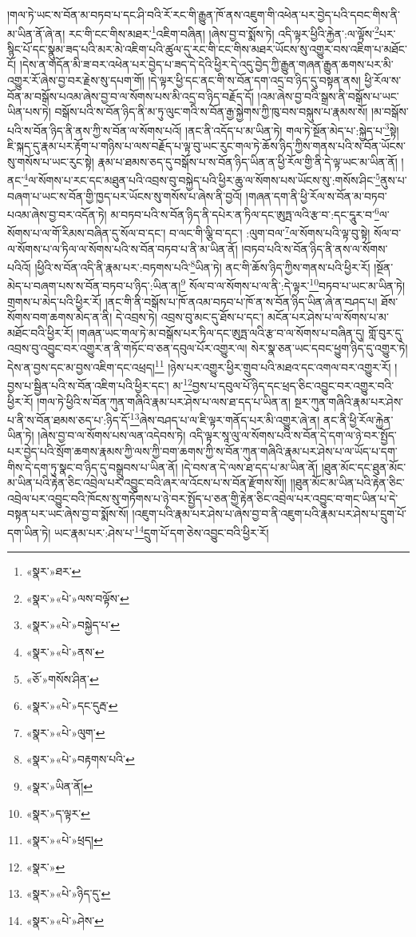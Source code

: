 །གལ་ཏེ་ཡང་ས་བོན་མ་བཏབ་པ་དང་ཤི་བའི་རོ་རང་གི་རྒྱུན་ཁོ་ནས་འཇུག་གི་འཕེན་པར་བྱེད་པའི་དབང་གིས་ནི་མ་ཡིན་ནོ་ཞེ་ན། རང་གི་ངང་གིས་མཐར་\footnote{«སྣར་»ཐར་}འཇིག་བཞིན། །ཞེས་བྱ་བ་སྨོས་ཏེ། འདི་ལྟར་ཕྱིའི་རྐྱེན་:ལ་ལྟོས་\footnote{«སྣར་»«པེ་»ལས་བལྟོས་}པར་སྙིང་པོ་དང་སྣུམ་ཟད་པའི་མར་མེ་འཇིག་པའི་ཚུལ་དུ་རང་གི་ངང་གིས་མཐར་ཡོངས་སུ་འགྱུར་བས་འཇིག་པ་མཐོང་ངོ། །དེས་ན་གདོན་མི་ཟ་བར་འཕེན་པར་བྱེད་པ་ཟད་དེ་དེའི་ཕྱིར་དེ་འདུ་བྱེད་ཀྱི་རྒྱུན་གཞན་རྒྱུན་ཆགས་པར་མི་འགྱུར་རོ་ཞེས་བྱ་བར་རྗེས་སུ་དཔག་གོ། །དེ་ལྟར་ཕྱི་དང་ནང་གི་ས་བོན་དག་འདྲ་བ་ཉིད་དུ་བསྟན་ནས། ཕྱི་རོལ་ས་བོན་མ་བསྒོས་པའམ་ཞེས་བྱ་བ་ལ་སོགས་པས་མི་འདྲ་བ་ཉིད་བརྗོད་དོ། །འམ་ཞེས་བྱ་བའི་སྒྲས་ནི་བསྒོས་པ་ཡང་ཡིན་པས་ཏེ། བསྒོས་པའི་ས་བོན་ཉིད་ནི་མ་ཏུ་ལུང་གའི་ས་བོན་རྒྱ་སྐྱེགས་ཀྱི་ཁུ་བས་བསྐུས་པ་རྣམས་སོ། །མ་བསྒོས་པའི་ས་བོན་ཉིད་ནི་ནས་ཀྱི་ས་བོན་ལ་སོགས་པའོ། །ནང་ནི་འདོད་པ་མ་ཡིན་ཏེ། གལ་ཏེ་སྔོན་མེད་པ་:སྐྱེད་པ་\footnote{«སྣར་»«པེ་»བསྐྱེད་པ་}སྟེ། ཇི་སྐད་དུ་རྣམ་པར་རྟོག་པ་གཉིས་པ་ལས་བརྗོད་པ་ལྟ་བུ་ཡང་རུང་གལ་ཏེ་ཆོས་ཉིད་ཀྱིས་གནས་པའི་ས་བོན་ཡོངས་སུ་གསོས་པ་ཡང་རུང་སྟེ། རྣམ་པ་ཐམས་ཅད་དུ་བསྒོས་པ་ས་བོན་ཉིད་ཡིན་ན་ཕྱི་རོལ་གྱི་ནི་དེ་ལྟ་ཡང་མ་ཡིན་ནོ། །ནང་\footnote{«སྣར་»«པེ་»ནས་}ལ་སོགས་པ་རང་དང་མཐུན་པའི་འབྲས་བུ་བསྐྱེད་པའི་ཕྱིར་ཆུ་ལ་སོགས་པས་ཡོངས་སུ་:གསོས་ཤིང་\footnote{«ཅོ་»གསོས་ཤིན་}ནུས་པ་བཞག་པ་ཡང་ས་བོན་གྱི་ཁྱད་པར་ཡོངས་སུ་གསོས་པ་ཞེས་ནི་བྱའོ། །གཞན་དག་ནི་ཕྱི་རོལ་ས་བོན་མ་བཏབ་པའམ་ཞེས་བྱ་བར་འདོན་ཏེ། མ་བཏབ་པའི་ས་བོན་ཉིད་ནི་དཔེར་ན་ཏིལ་དང་ཨུཏྤ་ལའི་རྩ་བ་:དང་དཱུར་བ་\footnote{«སྣར་»«པེ་»དང་དུརྦ་}ལ་སོགས་པ་ལ་གོ་རིམས་བཞིན་དུ་སོལ་བ་དང་། བ་ལང་གི་ལྕི་བ་དང་། :ལུག་བལ་\footnote{«སྣར་»«པེ་»ལུག་}ལ་སོགས་པའི་ལྟ་བུ་སྟེ། སོལ་བ་ལ་སོགས་པ་ལ་ཏིལ་ལ་སོགས་པའི་ས་བོན་བཏབ་པ་ནི་མ་ཡིན་ནོ། །བཏབ་པའི་ས་བོན་ཉིད་ནི་ནས་ལ་སོགས་པའིའོ། །ཕྱིའི་ས་བོན་འདི་ནི་རྣམ་པར་:བཏགས་པའི་\footnote{«སྣར་»«པེ་»བརྟགས་པའི་}ཡིན་ཏེ། ནང་གི་ཆོས་ཉིད་ཀྱིས་གནས་པའི་ཕྱིར་རོ། །སྔོན་མེད་པ་བཞག་པས་ས་བོན་བཏབ་པ་ཉིད་:ཡིན་ན།\footnote{«སྣར་»ཡིན་ནོ།} སོལ་བ་ལ་སོགས་པ་ལ་ནི་:དེ་ལྟར་\footnote{«སྣར་»ད་ལྟར་}བཏབ་པ་ཡང་མ་ཡིན་ཏེ། གྲགས་པ་མེད་པའི་ཕྱིར་རོ། །ནང་གི་ནི་བསྒོས་པ་ཁོ་ནའམ་བཏབ་པ་ཁོ་ན་ས་བོན་ཉིད་ཡིན་ཞེ་ན་བཤད་པ། ཐོས་སོགས་བག་ཆགས་མེད་ན་ནི། དེ་འབྲས་ཏེ། འབྲས་བུ་མང་དུ་ཐོས་པ་དང་། མངོན་པར་ཤེས་པ་ལ་སོགས་པ་མ་མཐོང་བའི་ཕྱིར་རོ། །གཞན་ཡང་གལ་ཏེ་མ་བསྒོས་པར་ཏིལ་དང་ཨུཏྤ་ལའི་རྩ་བ་ལ་སོགས་པ་བཞིན་དུ། གློ་བུར་དུ་འབྲས་བུ་འབྱུང་བར་འགྱུར་ན་ནི་གཏོང་བ་ཅན་དབུལ་པོར་འགྱུར་ལ། སེར་སྣ་ཅན་ཡང་དབང་ཕྱུག་ཉིད་དུ་འགྱུར་ཏེ། དེས་ན་བྱས་དང་མ་བྱས་འཇིག་དང་འཕྲད།\footnote{«སྣར་»«པེ་»ཕྲད།} །ཉེས་པར་འགྱུར་ཕྱིར་གྲུབ་པའི་མཐའ་དང་འགལ་བར་འགྱུར་རོ། །བྱས་པ་སྦྱིན་པའི་ས་བོན་འཇིག་པའི་ཕྱིར་དང་། མ་\footnote{«སྣར་»}བྱས་པ་དབུལ་པོ་ཉིད་དང་ཕྲད་ཅིང་འབྱུང་བར་འགྱུར་བའི་ཕྱིར་རོ། །གལ་ཏེ་ཕྱིའི་ས་བོན་ཀུན་གཞིའི་རྣམ་པར་ཤེས་པ་ལས་ཐ་དད་པ་ཡིན་ན། སྔར་ཀུན་གཞིའི་རྣམ་པར་ཤེས་པ་ནི་ས་བོན་ཐམས་ཅད་པ་:ཉིད་དོ་\footnote{«སྣར་»«པེ་»ཉིད་དུ་}ཞེས་བཤད་པ་ལ་ཇི་ལྟར་གནོད་པར་མི་འགྱུར་ཞེ་ན། ནང་ནི་ཕྱི་རོལ་རྐྱེན་ཡིན་ཏེ། །ཞེས་བྱ་བ་ལ་སོགས་པས་ལན་འདེབས་ཏེ། འདི་ལྟར་སཱ་ལུ་ལ་སོགས་པའི་ས་བོན་དེ་དག་ལ་ཉེ་བར་སྤྱོད་པར་བྱེད་པའི་སྲོག་ཆགས་རྣམས་ཀྱི་ལས་ཀྱི་བག་ཆགས་ཀྱི་ས་བོན་ཀུན་གཞིའི་རྣམ་པར་ཤེས་པ་ལ་ཡོད་པ་དག་གིས་དེ་དག་ཏུ་སྣང་བ་ཉིད་དུ་བསྒྲུབས་པ་ཡིན་ནོ། །དེ་བས་ན་དེ་ལས་ཐ་དད་པ་མ་ཡིན་ནོ། །ཐུན་མོང་དང་ཐུན་མོང་མ་ཡིན་པའི་རྟེན་ཅིང་འབྲེལ་པར་འབྱུང་བའི་ཞར་ལ་འོངས་པ་ས་བོན་རྫོགས་སོ།། །།ཐུན་མོང་མ་ཡིན་པའི་རྟེན་ཅིང་འབྲེལ་པར་འབྱུང་བའི་ཁོངས་སུ་གཏོགས་པ་ཉེ་བར་སྤྱོད་པ་ཅན་གྱི་རྟེན་ཅིང་འབྲེལ་པར་འབྱུང་བ་གང་ཡིན་པ་དེ་བསྟན་པར་ཡང་ཞེས་བྱ་བ་སྨོས་སོ། །འཇུག་པའི་རྣམ་པར་ཤེས་པ་ཞེས་བྱ་བ་ནི་འཇུག་པའི་རྣམ་པར་ཤེས་པ་དྲུག་པོ་དག་ཡིན་ཏེ། ཡང་རྣམ་པར་:ཤེས་པ་\footnote{«སྣར་»«པེ་»ཤེས་}དྲུག་པོ་དག་ཅེས་འབྱུང་བའི་ཕྱིར་རོ། 